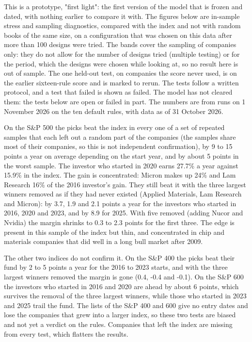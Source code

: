 \documentclass[11pt,a4paper]{article}
\begin{document}
This is a prototype, "first light": the first version of the model that is frozen and dated, with nothing earlier to compare it with. The figures below are in-sample stress and sampling diagnostics, compared with the index and not with random books of the same size, on a configuration that was chosen on this data after more than 100 designs were tried. The bands cover the sampling of companies only: they do not allow for the number of designs tried (multiple testing) or for the period, which the designs were chosen while looking at, so no result here is out of sample. The one held-out test, on companies the score never used, is on the earlier sixteen-rule score and is marked to rerun. The tests follow a written protocol, and a test that failed is shown as failed. The model has not cleared them: the tests below are open or failed in part. The numbers are from runs on 1 November 2026 on the ten default rules, with data as of 31 October 2026.

On the S\&P 500 the picks beat the index in every one of a set of repeated samples that each left out a random part of the companies (the samples share most of their companies, so this is not independent confirmation), by 9 to 15 points a year on average depending on the start year, and by about 5 points in the worst sample. The investor who started in 2020 earns 27.7\% a year against 15.9\% in the index. The gain is concentrated: Micron makes up 24\% and Lam Research 16\% of the 2016 investor's gain. They still beat it with the three largest winners removed as if they had never existed (Applied Materials, Lam Research and Micron): by 3.7, 1.9 and 2.1 points a year for the investors who started in 2016, 2020 and 2023, and by 8.9 for 2025. With five removed (adding Nucor and Nvidia) the margin shrinks to 0.3 to 2.3 points for the first three. The edge is present in this sample of the index but thin, and concentrated in chip and materials companies that did well in a long bull market after 2009.

The other two indices do not confirm it. On the S\&P 400 the picks beat their fund by 2 to 5 points a year for the 2016 to 2023 starts, and with the three largest winners removed the margin is gone (0.4, -0.4 and -0.1). On the S\&P 600 the investors who started in 2016 and 2020 are ahead by about 6 points, which survives the removal of the three largest winners, while those who started in 2023 and 2025 trail the fund. The lists of the S\&P 400 and 600 give no entry dates and lose the companies that grew into a larger index, so these two tests are biased and not yet a verdict on the rules. Companies that left the index are missing from every test, which flatters the results.
\end{document}

